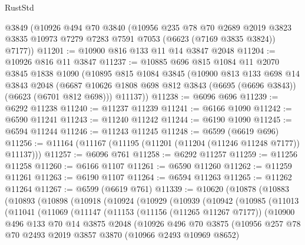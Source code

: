 \begin{lexlean}{RustStd}
\begin{coremodule}
    @3849
    (@10926
      @494
      @70
      @3840
      (@10956
        @235
        @78
        @70
        @2689
        @2019
        @3823
        @3835
        @10973
        @7279
        @7283
        @7591
        @7053
        (@6623 (@7169 @3835 @3824))
        @7177))
@11201 := @10900 @816 @133 @11 @14 @3847 @2048
@11204 := @10926 @816 @11 @3847
@11237 := @10885
    @696
    @815
    @1084
    @11
    @2070
    @3845
    @1838
    @1090
    (@10895
      @815
      @1084
      @3845
      (@10900
        @813
        @133
        @698
        @14
        @3843
        @2048
        (@6687 @10626 @1808 @698 @812 @3843 (@6695 (@6696 @3843)) (@6623 (@6701 @812 @698)))
        @11137))
@11238 := @6096 @696
@11239 := @6292 @11238
@11240 := @11237 @11239
@11241 := @6166 @1090
@11242 := @6590 @11241
@11243 := @11240 @11242
@11244 := @6190 @1090
@11245 := @6594 @11244
@11246 := @11243 @11245
@11248 := @6599 (@6619 @696)
@11256 := @11164 (@11167 (@11195 (@11201 (@11204 (@11246 @11248 @7177)) @11137)))
@11257 := @6096 @761
@11258 := @6292 @11257
@11259 := @11256 @11258
@11260 := @6166 @1107
@11261 := @6590 @11260
@11262 := @11259 @11261
@11263 := @6190 @1107
@11264 := @6594 @11263
@11265 := @11262 @11264
@11267 := @6599 (@6619 @761)
@11339 := @10620
    (@10878
      (@10883
        (@10893
          (@10898
            (@10918
              (@10924
                (@10929
                  (@10939
                    (@10942
                      (@10985
                        (@11013
                          (@11041
                            (@11069
                              (@11147
                                (@11153
                                  (@11156 (@11265 @11267 @7177))
                                  (@10900
                                    @496
                                    @133
                                    @70
                                    @14
                                    @3875
                                    @2048
                                    (@10926
                                      @496
                                      @70
                                      @3875
                                      (@10956
                                        @257
                                        @78
                                        @70
                                        @2493
                                        @2019
                                        @3857
                                        @3870
                                        (@10966 @2493 @10969 @8652)

\end{coremodule}
\end{lexlean}
